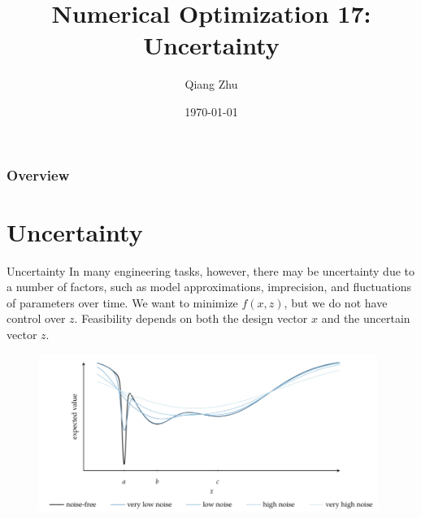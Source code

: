 \documentclass{beamer}
\title[Uncertainty]{Numerical Optimization 17: Uncertainty} %
\author{Qiang Zhu} %
\institute[University of Nevada Las Vegas] %
{
University of Nevada Las Vegas\\ %
\medskip
}
\date{\today} %
\begin{document}
\begin{frame}
\titlepage %
\end{frame}

\begin{frame}
\frametitle{Overview} %
\tableofcontents %
\end{frame}



\section{Uncertainty}
\begin{frame}{Uncertainty}
In many engineering tasks, however, there may be uncertainty due to a number of factors, such as model approximations, imprecision, and fluctuations of parameters over time. We want to minimize $f(x, z)$, but we do not have control over $z$. Feasibility depends on both the design vector $x$ and the uncertain vector $z$. 
\begin{figure}
\centering
\includegraphics[width=110mm]{Figs/uncertainty.jpeg}
\end{figure} 
\end{frame}
\end{document}
